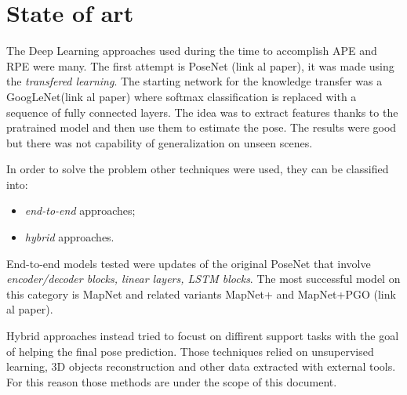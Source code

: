 \section{State of art}
The Deep Learning approaches used during the time to accomplish APE and RPE were many. The first attempt is PoseNet (link al paper), it was made using the \textit{transfered learning}. The starting network for the knowledge transfer was a GoogLeNet(link al paper) where softmax classification is replaced with a sequence of fully connected layers. The idea was to extract features thanks to the pratrained model and then use them to estimate the pose. The results were good but there was not capability of generalization on unseen scenes.

In order to solve the problem other techniques were used, they can be classified into:
\begin{itemize}
    \item \textit{end-to-end} approaches;
    \item \textit{hybrid} approaches.
\end{itemize}

End-to-end models tested were updates of the original PoseNet that involve \textit{encoder/decoder blocks, linear layers, LSTM blocks}. The most successful model on this category is MapNet and related variants MapNet+ and MapNet+PGO (link al paper).

Hybrid approaches instead tried to focust on diffirent support tasks with the goal of helping the final pose prediction. Those techniques relied on unsupervised learning, 3D objects reconstruction and other data extracted with external tools. For this reason those methods are under the scope of this document.
